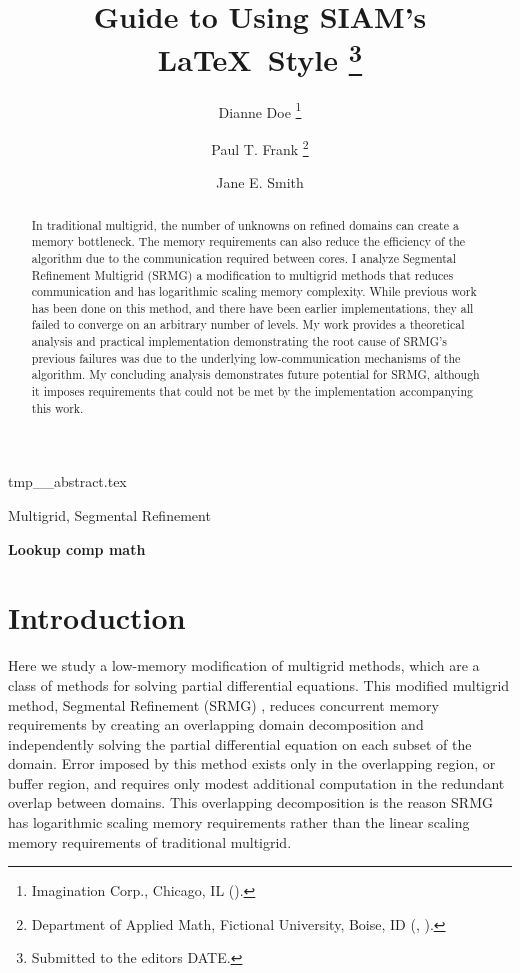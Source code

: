 \documentclass[final]{siamart1116}
\title{Guide to Using SIAM's \LaTeX\ Style%
  \thanks{Submitted to the editors DATE.
\funding{Funding information goes here.}}}
\author{Dianne Doe%
  \thanks{Imagination Corp., Chicago, IL (\email{ddoe@imag.com}).}%
  \and
  Paul T. Frank%
  \thanks{Department of Applied Math, Fictional University, Boise, ID
    (\email{ptfrank@fictional.edu}, \email{jesmith@fictional.edu}).}
  \and
  Jane E. Smith%
  \footnotemark[3]
}
\numberwithin{theorem}{section}
\begin{document}


\begin{tcbverbatimwrite}{tmp_\jobname_abstract.tex}
\begin{abstract}
	In traditional multigrid, the number of unknowns on refined domains can create a memory bottleneck. The memory requirements can also reduce the efficiency of the algorithm due to the communication required between cores. I analyze Segmental Refinement Multigrid (SRMG) a modification to multigrid methods that reduces communication and has logarithmic scaling memory complexity. While previous work has been done on this method, and there have been earlier implementations, they all failed to converge on an arbitrary number of levels. My work provides a theoretical analysis and practical implementation demonstrating the root cause of SRMG's previous failures was due to the underlying low-communication mechanisms of the algorithm. My concluding analysis demonstrates future potential for SRMG, although it imposes requirements that could not be met by the implementation accompanying this work. 
\end{abstract}

\begin{keywords}
 Multigrid, Segmental Refinement
\end{keywords}

\begin{AMS}
 \textbf{Lookup comp math}
\end{AMS}
\end{tcbverbatimwrite}


\section{Introduction}\label{sec:intro}
  
  Here we study a low-memory modification of multigrid methods, which are a class of methods for
solving partial differential equations. This modified multigrid method, Segmental Refinement (SRMG) \cite{brandt1994multigrid}, reduces concurrent memory requirements by creating an overlapping domain decomposition and independently solving the partial differential equation on each subset of the domain. Error imposed by this method exists only in the overlapping region, or buffer region, and requires only modest additional computation in the redundant overlap between domains. This overlapping decomposition is the reason SRMG has logarithmic scaling memory requirements rather than the linear scaling memory requirements of traditional multigrid.
    
\end{document}
